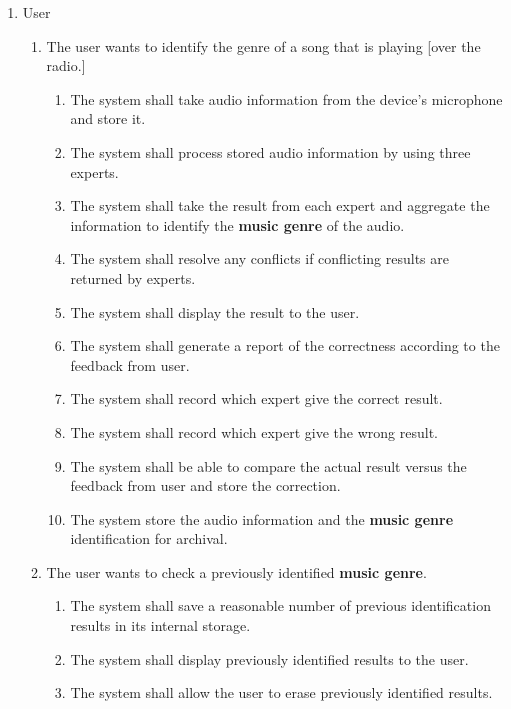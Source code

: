 \documentclass[]{article}
\begin{document}
\begin{enumerate}[{VP}1.]
	\item User 
	\begin{enumerate}[{BE1}.1]
		\item The user wants to identify the genre of a song that is playing [over the radio.]
		\begin{enumerate}
			\item The system shall take audio information from the device’s microphone and store it.
			\item The system shall process stored audio information by using three experts.
			\item The system shall take the result from each expert and aggregate the information to identify the \textbf{music genre} of the audio.

			\item The system shall resolve any conflicts if conflicting results are returned by experts.
			\item The system shall display the result to the user.
			\item The system shall generate a report of the correctness according to the feedback from user.
			\item The system shall record which expert give the correct result.
			\item The system shall record which expert give the wrong result.
			\item The system shall be able to compare the actual result versus the feedback from user and store the correction.
			\item The system store the audio information and the \textbf{music genre} identification for archival.
		\end{enumerate}
		\item The user wants to check a previously identified \textbf{music genre}.
		\begin{enumerate}
			\item The system shall save a reasonable number of previous identification results in its internal storage.
			\item The system shall display previously identified results to the user.
			\item The system shall allow the user to erase previously identified results.

		\end{enumerate}
	\end{enumerate}
	
\end{enumerate}
\end{document}
